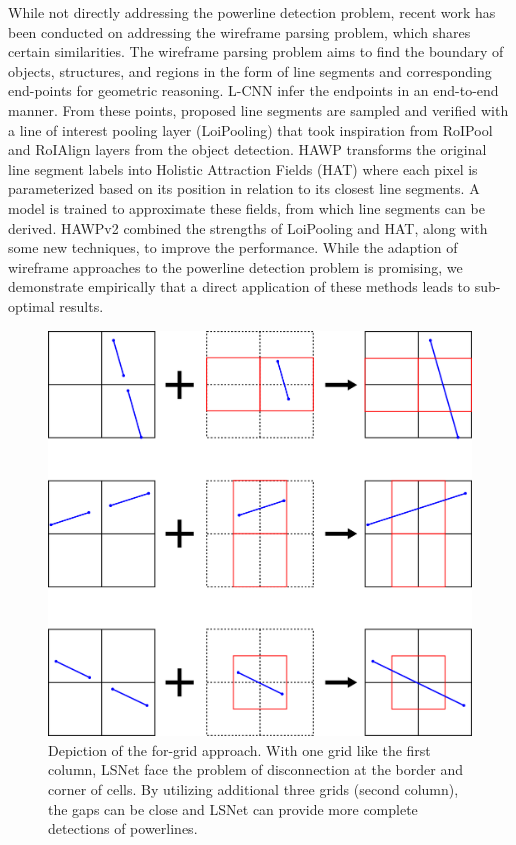 \documentclass[journal]{IEEEtran}
\begin{document}
While not directly addressing the powerline detection problem, recent work has been conducted on addressing the wireframe parsing problem, which shares certain similarities. The wireframe parsing problem aims to find the boundary of objects, structures, and regions in the form of line segments and corresponding end-points for geometric reasoning. L-CNN \cite{lcnn} infer the endpoints in an end-to-end manner. From these points, proposed line segments are sampled and verified with a line of interest pooling layer (LoiPooling) that took inspiration from RoIPool \cite{fastrcnn} and RoIAlign \cite{maskrcnn} layers from the object detection. HAWP \cite{hawp} transforms the original line segment labels into Holistic Attraction Fields (HAT) where each pixel is parameterized based on its position in relation to its closest line segments. A model is trained to approximate these fields, from which line segments can be derived. HAWPv2 \cite{hawpv2} combined the strengths of LoiPooling and HAT, along with some new techniques, to improve the performance. While the adaption of wireframe approaches to the powerline detection problem is promising, we demonstrate empirically that a direct application of these methods leads to sub-optimal results. 

\begin{figure}
  \includegraphics[width=\linewidth]{imgs/others/new_4grid.png}
  \caption{Depiction of the for-grid approach. With one grid like the first column, LSNet face the problem of disconnection at the border and corner of cells. By utilizing additional three grids (second column), the gaps can be close and LSNet can provide more complete detections of powerlines.}
  \label{4grid}
\end{figure}
\end{document}

